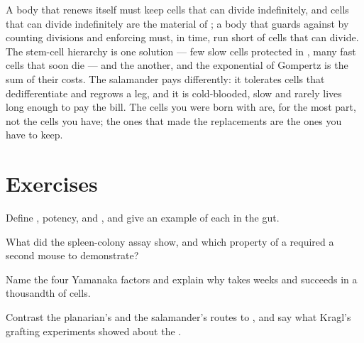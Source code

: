 \begin{remark}\label{rem:b3:stem-cells:remark}
A body that renews itself must keep cells that can divide
indefinitely, and cells that can divide indefinitely are the material
of ; a body that guards against  by counting divisions and
enforcing  must, in time, run short of cells that can divide.
The stem-cell hierarchy is one solution --- few slow cells protected in
, many fast cells that soon die --- and the  another,
and the exponential of Gompertz is the sum of their costs. The
salamander pays differently: it tolerates cells that dedifferentiate
and regrows a leg, and it is cold-blooded, slow and rarely lives long
enough to pay the  bill. The cells you were born with are, for
the most part, not the cells you have; the ones that made the
replacements are the ones you have to keep.
\end{remark}

\section{Exercises}

\begin{exercise}[$\star$]\label{exo:b3:stem-cells:1}
Define , potency,  and , and
give an example of each in the gut.
\end{exercise}

\begin{exercise}[$\star$]\label{exo:b3:stem-cells:2}
What did the spleen-colony assay show, and which property of a  required a second mouse to demonstrate?
\end{exercise}

\begin{exercise}[$\star$]\label{exo:b3:stem-cells:3}
Name the four Yamanaka factors and explain why  takes
weeks and succeeds in a thousandth of cells.
\end{exercise}

\begin{exercise}[$\star$]\label{exo:b3:stem-cells:4}
Contrast the planarian's and the salamander's routes to ,
and say what Kragl's grafting experiments showed about the .
\end{exercise}

